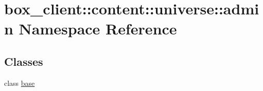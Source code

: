 \hypertarget{namespacebox__client_1_1content_1_1universe_1_1admin}{
\section{box\_\-client::content::universe::admin Namespace Reference}
\label{namespacebox__client_1_1content_1_1universe_1_1admin}
}
\subsection*{Classes}
\begin{DoxyCompactItemize}
\item 
class \hyperlink{classbox__client_1_1content_1_1universe_1_1admin_1_1base}{base}
\end{DoxyCompactItemize}
